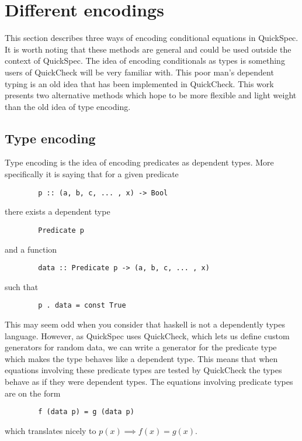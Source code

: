 \section{Different encodings}\label{encodings}

    This section describes three
    ways of encoding conditional
    equations in QuickSpec. It is
    worth noting that these methods
    are general and could be used outside
    the context of QuickSpec. The
    idea of encoding conditionals
    as types is something users of
    QuickCheck %
    will be very familiar with. This poor
    man's dependent typing is an old idea that has
    been implemented in QuickCheck.%
    This work presents two alternative methods
    which hope to be more flexible and light weight
    than the old idea of type encoding.

    \subsection{Type encoding}\label{TE}

        Type encoding is the idea of encoding
        predicates as dependent types. More specifically
        it is saying that for a given predicate
        \begin{verbatim}
        p :: (a, b, c, ... , x) -> Bool
        \end{verbatim}
        there exists a dependent type
        \begin{verbatim}
        Predicate p
        \end{verbatim}
        and a function 
        \begin{verbatim}
        data :: Predicate p -> (a, b, c, ... , x)
        \end{verbatim}
        such that 
        \begin{verbatim}
        p . data = const True
        \end{verbatim}
        This may seem odd when you consider that haskell is not a dependently types
        language. However, as QuickSpec uses QuickCheck, which lets us define
        custom generators for random data, we can write a generator for 
        the predicate type which makes the type behaves like a dependent type.
        This means that when equations involving these predicate
        types are tested by QuickCheck the types behave as if they were dependent types.
        The equations involving predicate types are on the form
        \begin{verbatim}
        f (data p) = g (data p)
        \end{verbatim}
        which translates nicely to $p(x) \implies f(x) = g(x)$.

